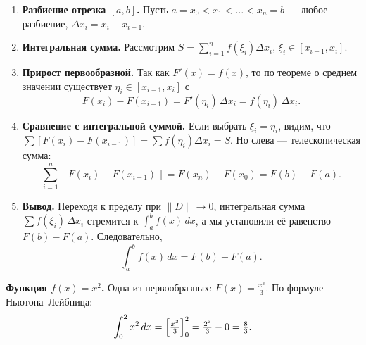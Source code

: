 \begin{enumerate}
  \item \textbf{Разбиение отрезка \([a,b]\).}
    Пусть \(a=x_0 < x_1 < \dots < x_n=b\) — любое разбиение, \(\Delta x_i=x_i-x_{i-1}\).
  \item \textbf{Интегральная сумма.}
    Рассмотрим \(S = \sum_{i=1}^n f(\xi_i)\Delta x_i\), \(\xi_i\in[x_{i-1},x_i]\).
  \item \textbf{Прирост первообразной.}
    Так как \(F'(x)=f(x)\), то по теореме о среднем значении существует \(\eta_i\in[x_{i-1},x_i]\) с
    \[
      F(x_i)-F(x_{i-1}) = F'(\eta_i)\,\Delta x_i = f(\eta_i)\,\Delta x_i.
    \]
  \item \textbf{Сравнение с интегральной суммой.}
    Если выбрать \(\xi_i=\eta_i\), видим, что \(\sum [F(x_i)-F(x_{i-1})] = \sum f(\eta_i)\Delta x_i = S\). Но слева — телескопическая сумма:
    \[
      \sum_{i=1}^n [\,F(x_i)-F(x_{i-1})\,]
      = F(x_n)-F(x_0) = F(b)-F(a).
    \]
  \item \textbf{Вывод.}
    Переходя к пределу при \(\|D\|\to 0\), интегральная сумма \(\sum f(\xi_i)\,\Delta x_i\) стремится к \(\int_a^b f(x)\,dx\), а мы установили её равенство \(F(b)-F(a)\). Следовательно,
    \[
      \int_a^b f(x)\,dx = F(b) - F(a).
    \]
\end{enumerate}

\medskip


\textbf{Функция \(f(x)=x^2\).}
Одна из первообразных: \(F(x)=\tfrac{x^3}{3}\). По формуле Ньютона–Лейбница:
\[
\int_0^2 x^2\,dx
= \Bigl[\tfrac{x^3}{3}\Bigr]_0^2
= \tfrac{2^3}{3} - 0 = \tfrac{8}{3}.
\]


